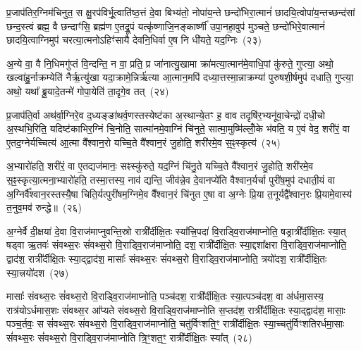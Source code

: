 प्र॒जाप॑तिर॒ग्निम॑चिनुत॒ स क्षु॒रप॑विर्भू॒त्वाति॑ष्ठ॒त्तं दे॒वा बिभ्य॑तो॒ नोपा॑य॒न्ते छन्दो॑भिरा॒त्मानं॑ छादयि॒त्वोपा॑य॒न्तच्छन्द॑सां छन्द॒स्त्वं ब्रह्म॒ वै छन्दाꣳ॑सि॒ ब्रह्म॑ण ए॒तद्रू॒पं यत्कृ॑ष्णाजि॒नङ्कार्ष्णी॑ उपा॒नहा॒वुप॑ मुञ्चते॒ छन्दो॑भिरे॒वात्मानं॑ छादयि॒त्वाग्निमुप॑ चरत्या॒त्मनो\-ऽहिꣳ॑सायै देवनि॒धिर्वा ए॒ष नि धी॑यते॒ यद॒ग्निः~(२३)

अ॒न्ये वा॒ वै नि॒धिमगु॑प्तं वि॒न्दन्ति॒ न वा॒ प्रति॒ प्र जा॑नात्यु॒खामा क्रा॑मत्या॒त्मान॑मे॒वाधि॒पां कु॑रुते॒ गुप्त्या॒ अथो॒ खल्वा॑हु॒र्नाक्रम्येति॑ नैर्\mbox{}ऋ॒त्यु॑खा यदा॒क्रामे॒न्निर्\mbox{}ऋ॑त्या आ॒त्मान॒मपि॑ दध्या॒त्तस्मा॒न्नाक्रम्या॑ पुरुषशी॒र्\mbox{}षमुप॑ दधाति॒ गुप्त्या॒ अथो॒ यथा᳚ ब्रू॒यादे॒तन्मे॑ गोपा॒येति॑ ता॒दृगे॒व तत्~(२४)

प्र॒जाप॑ति॒र्वा अथ॑र्वा॒ग्निरे॒व द॒ध्यङ्ङा॑थर्व॒णस्तस्येष्ट॑का अ॒स्थान्ये॒तꣳ ह॒ वाव तदृषि॑र॒भ्यनू॑वा॒चेन्द्रो॑ दधी॒चो अ॒स्थभि॒रिति॒ यदिष्ट॑काभिर॒ग्निं चि॒नोति॒ सात्मा॑नमे॒वाग्निं चि॑नुते॒ सात्मा॒मुष्मि॑ल्लोँ॒के भ॑वति॒ य ए॒वं वेद॒ शरी॑रं॒ वा ए॒तद॒ग्नेर्यच्चित्य॑ आ॒त्मा वै᳚श्वान॒रो यच्चि॒ते वै᳚श्वान॒रं जु॒होति॒ शरी॑रमे॒व स॒ꣴ॒स्कृत्य॑~(२५)

अ॒भ्यारो॑हति॒ शरी॑रं॒ वा ए॒तद्यज॑मानः॒ सꣴस्कु॑रुते॒ यद॒ग्निं चि॑नु॒ते यच्चि॒ते वै᳚श्वान॒रं जु॒होति॒ शरी॑रमे॒व स॒ꣴ॒स्कृत्या॒त्मना॒भ्यारो॑हति॒ तस्मा॒त्तस्य॒ नाव॑ द्यन्ति॒ जीव॑न्ने॒व दे॒वानप्ये॑ति वैश्वान॒र्यर्चा पुरी॑ष॒मुप॑ दधाती॒यं वा अ॒ग्निर्वै᳚श्वान॒रस्तस्यै॒षा चिति॒र्यत्पुरी॑षम॒ग्निमे॒व वै᳚श्वान॒रं चि॑नुत ए॒षा वा अ॒ग्नेः प्रि॒या त॒नूर्यद्वै᳚श्वान॒रः प्रि॒यामे॒वास्य॑ त॒नुव॒मव॑ रुन्द्धे॥~(२६)

{\anuvakamend[{अ॒ग्निस्तथ्स॒ꣴ॒स्कृत्या॒ग्नेर्दश॑ च}]}%

अ॒ग्नेर्वै दी॒क्षया॑ दे॒वा वि॒राज॑माप्नुवन्ति॒स्रो रात्री᳚र्दीक्षि॒तः स्या᳚त्त्रि॒पदा॑ वि॒राड्वि॒राज॑माप्नोति॒ षड्रात्री᳚र्दीक्षि॒तः स्या॒त् षड्वा ऋ॒तवः॑ संवथ्स॒रः सं॑वथ्स॒रो वि॒राड्वि॒राज॑माप्नोति॒ दश॒ रात्री᳚र्दीक्षि॒तः स्या॒द्दशा᳚क्षरा वि॒राड्वि॒राज॑माप्नोति॒ द्वाद॑श॒ रात्री᳚र्दीक्षि॒तः स्या॒द्द्वाद॑श॒ मासाः᳚ संवथ्स॒रः सं॑वथ्स॒रो वि॒राड्वि॒राज॑माप्नोति॒ त्रयो॑दश॒ रात्री᳚र्दीक्षि॒तः स्या॒त्त्रयो॑दश~(२७)

मासाः᳚ संवथ्स॒रः सं॑वथ्स॒रो वि॒राड्वि॒राज॑माप्नोति॒ पञ्च॑दश॒ रात्री᳚र्दीक्षि॒तः स्या॒त्पञ्च॑दश॒ वा अ॑र्धमा॒सस्य॒ रात्र॑यो\-ऽर्धमास॒शः सं॑वथ्स॒र आ᳚प्यते संवथ्स॒रो वि॒राड्वि॒राज॑माप्नोति स॒प्तद॑श॒ रात्री᳚र्दीक्षि॒तः स्या॒द्द्वाद॑श॒ मासाः॒ पञ्च॒र्तवः॒ स सं॑वथ्स॒रः सं॑वथ्स॒रो वि॒राड्वि॒राज॑माप्नोति॒ चतु॑र्विꣳशति॒ꣳ॒ रात्री᳚र्दीक्षि॒तः स्या॒च्चतु॑र्विꣳशतिरर्धमा॒साः सं॑वथ्स॒रः सं॑वथ्स॒रो वि॒राड्वि॒राज॑माप्नोति त्रि॒ꣳ॒शत॒ꣳ॒ रात्री᳚र्दीक्षि॒तः स्या᳚त्~(२८)

